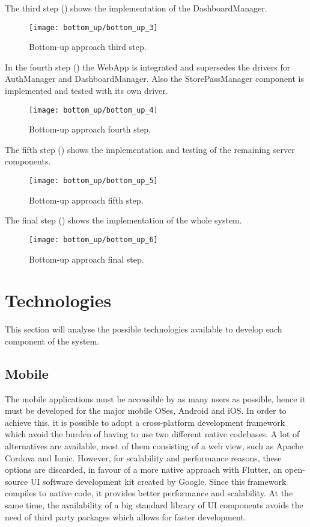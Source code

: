 The third step () shows the implementation of the DashboardManager.
\begin{figure}[H]
	\centering
	\texttt{[image: bottom\_up/bottom\_up\_3]}
	\caption{Bottom-up approach third step.}
	\label{fig:bottom_up_3}
\end{figure}

In the fourth step () the WebApp is integrated and supersedes the drivers for AuthManager and DashboardManager. Also the StorePassManager component is implemented and tested with its own driver.
\begin{figure}[H]
	\centering
	\texttt{[image: bottom\_up/bottom\_up\_4]}
	\caption{Bottom-up approach fourth step.}
	\label{fig:bottom_up_4}
\end{figure}

\clearpage

The fifth step () shows the implementation and testing of the remaining server components.
\begin{figure}[H]
	\centering
	\texttt{[image: bottom\_up/bottom\_up\_5]}
	\caption{Bottom-up approach fifth step.}
	\label{fig:bottom_up_5}
\end{figure}

\clearpage

The final step () shows the implementation of the whole system.
\begin{figure}[H]
	\centering
	\texttt{[image: bottom\_up/bottom\_up\_6]}
	\caption{Bottom-up approach final step.}
	\label{fig:bottom_up_6}
\end{figure}

\clearpage

\section{Technologies}\label{iit:tech}
This section will analyse the possible technologies available to develop each component of the system.

\subsection{Mobile}
The mobile applications must be accessible by as many users as possible, hence it must be developed for the major mobile OSes, Android and iOS.
In order to achieve this, it is possible to adopt a cross-platform development framework which  avoid the burden of having to use two different native codebases.
A lot of alternatives are available, most of them consisting of a web view, such as Apache Cordova and Ionic. 
However, for scalability and performance reasons, these options are discarded, in favour of a more native approach with Flutter, an open-source UI software development kit created by Google.
Since this framework compiles to native code, it provides better performance and scalability. At the same time, the availability of a big standard library of UI components avoids the need of third party packages which allows for faster development.

